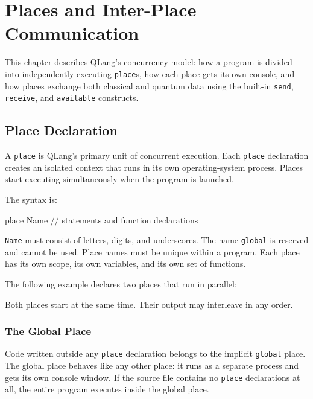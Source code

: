 \section{Places and Inter-Place Communication}
\label{sec:places-and-communication}

This chapter describes QLang's concurrency model: how a program is divided into
independently executing \texttt{place}s, how each place gets its own console,
and how places exchange both classical and quantum data using the built-in
\texttt{send}, \texttt{receive}, and \texttt{available} constructs.

\subsection{Place Declaration}
\label{sec:place-declaration}

A \texttt{place} is QLang's primary unit of concurrent execution. Each
\texttt{place} declaration creates an isolated context that runs in its own
operating-system process. Places start executing simultaneously when the
program is launched.

The syntax is:

\begin{codebox}
place Name {
    // statements and function declarations
}
\end{codebox}

\texttt{Name} must consist of letters, digits, and underscores. The name
\texttt{global} is reserved and cannot be used. Place names must be unique
within a program. Each place has its own scope, its own variables, and its
own set of functions.

The following example declares two places that run in parallel:



Both places start at the same time. Their output may interleave in any order.

\subsubsection{The Global Place}

Code written outside any \texttt{place} declaration belongs to the implicit
\texttt{global} place. The global place behaves like any other place: it runs as
a separate process and gets its own console window. If the source file contains
no \texttt{place} declarations at all, the entire program executes inside the
global place.

